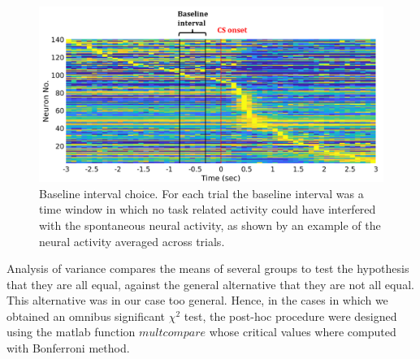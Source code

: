 \begin{figure}
    \centering
    \includegraphics[scale=0.6]{figures/Baseline.png}
    \caption{Baseline interval choice. For each trial the baseline interval was a time window in which no task related activity could have interfered with the spontaneous neural activity, as shown by an example of the neural activity averaged across trials.}
    \label{fig:Baseline}
\end{figure}
Analysis of variance compares the means of several groups to test the hypothesis that they are all equal, against the general alternative that they are not all equal. This alternative was in our case too general. Hence, in the cases in which we obtained an omnibus significant $\chi^2$ test, the post-hoc procedure were designed using the matlab function $\textit{multcompare}$ whose critical values where computed with Bonferroni method.\\
